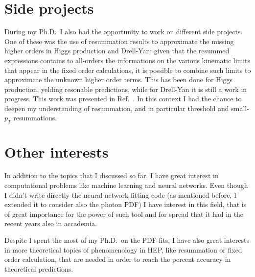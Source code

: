 \documentclass[11pt,a4paper]{moderncv}        %
\begin{document}
\section{Side projects}

During my Ph.D.\ I also had the opportunity to work on different side projects.
%
One of these was the use of resummation results to approximate the missing higher orders in Higgs production and Drell-Yan:
given that the resummed expressions
contains to all-orders the informations on the various kinematic limits that appear in the fixed order calculations, it is possible
to combine such limits to approximate the unknown higher order terms.
This has been done for Higgs production, yelding resonable predictions, while for Drell-Yan it is still a work in progress.
This work was presented in Ref.~\cite{laurenti2022approximating}.
In this context I had the chance to deepen my understanding of resummation, and in particular threshold and small-$p_T$ resummations.

\section{Other interests}

In addition to the topics that I discussed so far, I have great interest
in computational problems like machine learning and neural networks.
Even though I didn't write directly the neural network fitting code (as mentioned before, I extended it to consider also the photon PDF)
I have interest in this field, that is of great importance for the power of such tool and for spread that it had in the recent years
also in accademia.

Despite I spent the most of my Ph.D.\ on the PDF fits, I have also great interests in more theoretical topics of phenomenology in HEP,
like resummation or fixed order calculation, that are needed in order to reach the percent accuracy in theoretical predictions.



\end{document}
